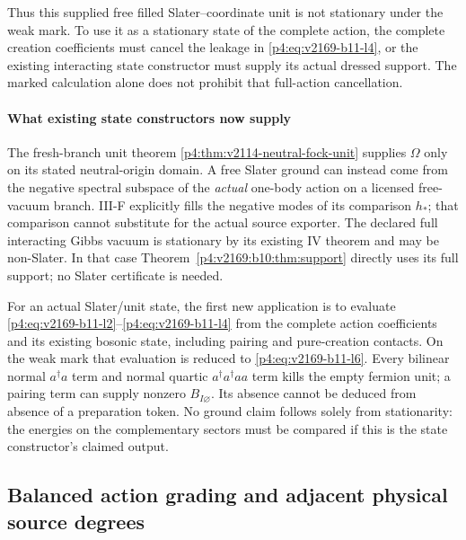 \documentclass[12pt,a4paper]{article}
\begin{document}
Thus this supplied free filled Slater--coordinate unit is not stationary
under the weak mark. To use it as a stationary state of the complete action,
the complete creation coefficients must cancel the leakage in \eqref{p4:eq:v2169-b11-l4}, or the
existing interacting state constructor must supply its actual dressed support.
The marked calculation alone does not prohibit that full-action cancellation.



\paragraph{What existing state constructors now supply}
The fresh-branch unit theorem \ref{p4:thm:v2114-neutral-fock-unit} supplies
$\Omega$ only on its stated neutral-origin domain. A free Slater ground
can instead come from the negative spectral subspace of the \emph{actual}
one-body action on a licensed free-vacuum branch. III-F explicitly fills the
negative modes of its comparison $h_*$; that comparison cannot substitute
for the actual source exporter. The declared full interacting Gibbs vacuum
is stationary by its existing IV theorem and may be non-Slater. In that
case Theorem~\ref{p4:v2169:b10:thm:support} directly uses its full support; no Slater certificate is needed.

For an actual Slater/unit state, the first new application is to evaluate
\eqref{p4:eq:v2169-b11-l2}--\eqref{p4:eq:v2169-b11-l4} from the complete action coefficients and its existing bosonic
state, including pairing and pure-creation contacts. On the weak mark that
evaluation is reduced to \eqref{p4:eq:v2169-b11-l6}. Every bilinear normal $a^\dagger a$ term and
normal quartic $a^\dagger a^\dagger aa$ term kills the empty fermion unit;
a pairing term can supply nonzero $B_{I\varnothing}$. Its absence cannot be
deduced from absence of a preparation token. No ground claim follows solely
from stationarity: the energies on the complementary sectors must be compared
if this is the state constructor's claimed output.





\subsection{Balanced action grading and adjacent physical source degrees}
\label{p4:sec:v2169-adjacent-degrees}
\end{document}

